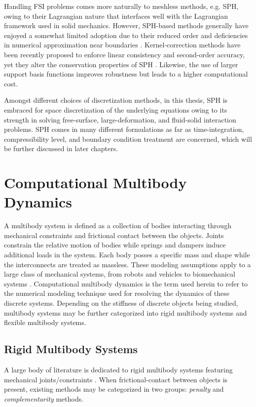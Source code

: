 Handling FSI problems comes more naturally to meshless methods, e.g. SPH, owing to their Lagrangian nature that interfaces well with the Lagrangian framework used in solid mechanics. However, SPH-based methods generally have enjoyed a somewhat limited adoption due to their reduced order and deficiencies in numerical approximation near boundaries \cite{trask2016compact}. Kernel-correction methods have been recently proposed to enforce linear consistency and second-order accuracy, yet they alter the conservation properties of SPH \cite{fatehi2011,Libersky1993,randles1996,Trask2015,islam2018consistency}. Likewise, the use of larger support basis functions improves robustness but leads to a higher computational cost.

Amongst different choices of discretization methods, in this thesis, SPH is embraced for space discretization of the underlying equations owing to its strength in solving free-surface, large-deformation, and fluid-solid interaction problems. SPH comes in many different formulations as far as time-integration, compressibility level, and boundary condition treatment are concerned, which will be further discussed in later chapters.



\section{Computational Multibody Dynamics}
A multibody system is defined as a collection of bodies interacting through mechanical constraints and frictional contact between the objects. Joints constrain the relative motion of bodies while springs and dampers induce additional loads in the system. Each body posses a specific mass and shape while the interconnects are treated as massless. These modeling assumptions apply to a large class of mechanical systems, from robots and vehicles to biomechanical systems \cite{simeon2013computational}. Computational multibody dynamics is the term used herein to refer to the numerical modeling technique used for resolving the dynamics of these discrete systems. Depending on the stiffness of discrete objects being studied, multibody systems may be further categorized into rigid multibody systems and flexible multibody systems.
\subsection{Rigid Multibody Systems}\label{sec:back_rigid}
A large body of literature is dedicated to rigid multibody systems featuring mechanical joints/constraints \cite{Haug89,shabana2013}. When frictional-contact between objects  is present, existing methods may be categorized in two groups: \textit{penalty} and \textit{complementarity} methods.

